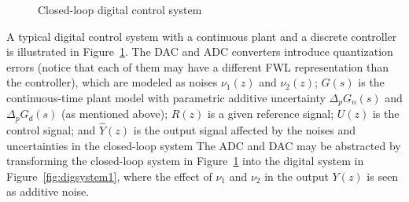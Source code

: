 \documentclass[final]{sig-alternate-05-2015}
\begin{document}
\begin{figure}[htb]
{
}
 \caption{Closed-loop digital control system \label{fig:sampledsystem}}
\end{figure}

A typical digital control system with a continuous plant and a discrete
controller is illustrated in Figure~\ref{fig:sampledsystem}.  The DAC and
ADC converters introduce quantization errors (notice that each of them
may have a different FWL representation than the controller),
which are modeled as noises
$\nu_{1}(z)$ and $\nu_{2}(z)$;  
$G(s)$ is the continuous-time plant model
with parametric additive uncertainty $\Delta_p{G}_n(s)$ and $\Delta_p{G}_d(s)$ (as mentioned above);  
$R(z)$ is a given reference signal; 
$U(z)$ is the control signal; 
and $\hat{Y}(z)$ is the output signal affected by the noises and uncertainties in the closed-loop system 
%
%
%
The ADC and DAC may be abstracted by transforming the closed-loop system in
Figure~\ref{fig:sampledsystem} into the digital system in 
Figure~\ref{fig:digsystem1}, 
where 
the effect of $\nu_{1}$ and $\nu_{2}$ in the output $Y(z)$ is
seen as additive noise.  
\end{document}
